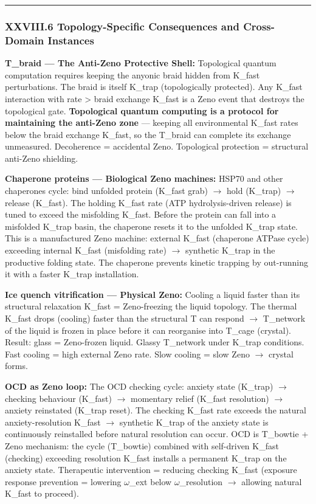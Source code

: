 \documentclass[12pt,a4paper]{article}
\begin{document}
\begin{center}
\rule{0.5\textwidth}{0.4pt}
\end{center}

\subsubsection{XXVIII.6 Topology-Specific Consequences and Cross-Domain Instances}

\textbf{T\_braid --- The Anti-Zeno Protective Shell:}
Topological quantum computation requires keeping the anyonic braid hidden from K\_fast perturbations. The braid is itself K\_trap (topologically protected). Any K\_fast interaction with rate \textgreater{} braid exchange K\_fast is a Zeno event that destroys the topological gate. \textbf{Topological quantum computing is a protocol for maintaining the anti-Zeno zone} --- keeping all environmental K\_fast rates below the braid exchange K\_fast, so the T\_braid can complete its exchange unmeasured. Decoherence = accidental Zeno. Topological protection = structural anti-Zeno shielding.

\textbf{Chaperone proteins --- Biological Zeno machines:}
HSP70 and other chaperones cycle: bind unfolded protein (K\_fast grab) $\rightarrow$ hold (K\_trap) $\rightarrow$ release (K\_fast). The holding K\_fast rate (ATP hydrolysis-driven release) is tuned to exceed the misfolding K\_fast. Before the protein can fall into a misfolded K\_trap basin, the chaperone resets it to the unfolded K\_trap state. This is a manufactured Zeno machine: external K\_fast (chaperone ATPase cycle) exceeding internal K\_fast (misfolding rate) $\rightarrow$ synthetic K\_trap in the productive folding state. The chaperone prevents kinetic trapping by out-running it with a faster K\_trap installation.

\textbf{Ice quench vitrification --- Physical Zeno:}
Cooling a liquid faster than its structural relaxation K\_fast = Zeno-freezing the liquid topology. The thermal K\_fast drops (cooling) faster than the structural T can respond $\rightarrow$ T\_network of the liquid is frozen in place before it can reorganise into T\_cage (crystal). Result: glass = Zeno-frozen liquid. Glassy T\_network under K\_trap conditions. Fast cooling = high external Zeno rate. Slow cooling = slow Zeno $\rightarrow$ crystal forms.

\textbf{OCD as Zeno loop:}
The OCD checking cycle: anxiety state (K\_trap) $\rightarrow$ checking behaviour (K\_fast) $\rightarrow$ momentary relief (K\_fast resolution) $\rightarrow$ anxiety reinstated (K\_trap reset). The checking K\_fast rate exceeds the natural anxiety-resolution K\_fast $\rightarrow$ synthetic K\_trap of the anxiety state is continuously reinstalled before natural resolution can occur. OCD is T\_bowtie + Zeno mechanism: the cycle (T\_bowtie) combined with self-driven K\_fast (checking) exceeding resolution K\_fast installs a permanent K\_trap on the anxiety state. Therapeutic intervention = reducing checking K\_fast (exposure response prevention = lowering $\omega$\_ext below $\omega$\_resolution $\rightarrow$ allowing natural K\_fast to proceed).
\end{document}
